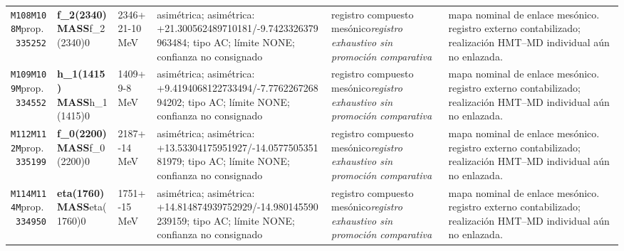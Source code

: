 \begin{landscape}
\begin{longtable}{L{1.85cm}L{4.45cm}L{2.35cm}L{4.05cm}L{3.35cm}L{7.15cm}}
\texttt{M108}\newline \texttt{M108M}\newline prop.\ \texttt{335252} & \textbf{f\_\allowbreak{}2(2340) MASS}\newline f\_\allowbreak{}2(2340)0 & 2346+21-10\,MeV & asimétrica; asimétrica: +21.300562489710181/-9.7423326379963484; tipo AC; límite NONE; confianza no consignado & registro compuesto mesónico\newline \emph{registro exhaustivo sin promoción comparativa} & mapa nominal de enlace mesónico. registro externo contabilizado; realización HMT--MD individual aún no enlazada. \\
\texttt{M109}\newline \texttt{M109M}\newline prop.\ \texttt{334552} & \textbf{h\_\allowbreak{}1(1415) MASS}\newline h\_\allowbreak{}1(1415)0 & 1409+9-8\,MeV & asimétrica; asimétrica: +9.4194068122733494/-7.776226726894202; tipo AC; límite NONE; confianza no consignado & registro compuesto mesónico\newline \emph{registro exhaustivo sin promoción comparativa} & mapa nominal de enlace mesónico. registro externo contabilizado; realización HMT--MD individual aún no enlazada. \\
\texttt{M112}\newline \texttt{M112M}\newline prop.\ \texttt{335199} & \textbf{f\_\allowbreak{}0(2200) MASS}\newline f\_\allowbreak{}0(2200)0 & 2187+-14\,MeV & asimétrica; asimétrica: +13.53304175951927/-14.057750535181979; tipo AC; límite NONE; confianza no consignado & registro compuesto mesónico\newline \emph{registro exhaustivo sin promoción comparativa} & mapa nominal de enlace mesónico. registro externo contabilizado; realización HMT--MD individual aún no enlazada. \\
\texttt{M114}\newline \texttt{M114M}\newline prop.\ \texttt{334950} & \textbf{eta(1760) MASS}\newline eta(1760)0 & 1751+-15\,MeV & asimétrica; asimétrica: +14.814874939752929/-14.980145590239159; tipo AC; límite NONE; confianza no consignado & registro compuesto mesónico\newline \emph{registro exhaustivo sin promoción comparativa} & mapa nominal de enlace mesónico. registro externo contabilizado; realización HMT--MD individual aún no enlazada. \\

\end{longtable}
\end{landscape}
